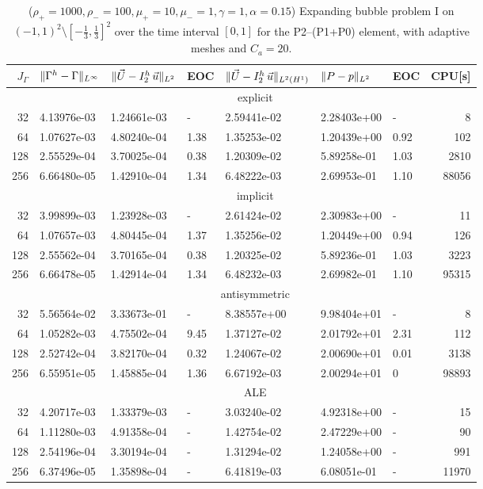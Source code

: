 \begin{table}
\center
\hspace*{-3.25cm}
\begin{tabular}{rllllllr}
\hline
$J_\Gamma$ & $\|\Gamma^h - \Gamma\|_{L^\infty}$ & $\|\vec U - I^h_{2}\,\vec u\|_{L^2}$ & EOC & $\|\vec U - I^h_{2}\,\vec u\|_{L^2(H^1)}$ & $\|P - p\|_{L^2}$ & EOC
& CPU[s] \\
\hline
& \multicolumn{7}{c}{explicit} \\
\hline
 32 & 4.13976e-03 & 1.24661e-03 &    - & 2.59441e-02 & 2.28403e+00 &    - &
8 \\
 64 & 1.07627e-03 & 4.80240e-04 & 1.38 & 1.35253e-02 & 1.20439e+00 & 0.92 &
102 \\
128 & 2.55529e-04 & 3.70025e-04 & 0.38 & 1.20309e-02 & 5.89258e-01 & 1.03 &
2810 \\
256 & 6.66480e-05 & 1.42910e-04 & 1.34 & 6.48222e-03 & 2.69953e-01 & 1.10 &
88056 \\
\hline
& \multicolumn{7}{c}{implicit} \\
\hline
 32 & 3.99899e-03 & 1.23928e-03 &    - & 2.61424e-02 & 2.30983e+00 &    - &
11 \\
 64 & 1.07657e-03 & 4.80445e-04 & 1.37 & 1.35256e-02 & 1.20449e+00 & 0.94 &
126 \\
128 & 2.55562e-04 & 3.70165e-04 & 0.38 & 1.20325e-02 & 5.89236e-01 & 1.03 &
3223 \\
256 & 6.66478e-05 & 1.42914e-04 & 1.34 & 6.48232e-03 & 2.69982e-01 & 1.10 &
95315 \\
\hline
& \multicolumn{7}{c}{antisymmetric} \\
\hline
 32 & 5.56564e-02 & 3.33673e-01 &    - & 8.38557e+00 & 9.98404e+01 &    - &
8 \\
 64 & 1.05282e-03 & 4.75502e-04 & 9.45 & 1.37127e-02 & 2.01792e+01 & 2.31 &
112 \\
128 & 2.52742e-04 & 3.82170e-04 & 0.32 & 1.24067e-02 & 2.00690e+01 & 0.01 &
3138 \\
256 & 6.55951e-05 & 1.45885e-04 & 1.36 & 6.67192e-03 & 2.00294e+01 &    0 &
98893 \\
\hline
& \multicolumn{7}{c}{ALE} \\
\hline
 32 & 4.20717e-03 & 1.33379e-03 & - & 3.03240e-02 & 4.92318e+00 & - &    15 \\
 64 & 1.11280e-03 & 4.91358e-04 & - & 1.42754e-02 & 2.47229e+00 & - &    90 \\
128 & 2.54196e-04 & 3.30194e-04 & - & 1.31294e-02 & 1.24058e+00 & - &   991 \\
256 & 6.37496e-05 & 1.35898e-04 & - & 6.41819e-03 & 6.08051e-01 & - & 11970 \\
\hline
\end{tabular}
\hspace*{-3.25cm}
\caption[Navier--Stokes expanding bubble III errors P2--(P1+P0)]
{($\rho_+ = 1000,\rho_- = 100,\mu_+ = 10,\mu_- =1,\gamma = 1,\alpha=0.15$)
Expanding bubble problem I on $(-1,1)^2\setminus[-\frac{1}{3},\frac{1}{3}]^2$
over the time interval $[0,1]$ for the P2--(P1+P0) element, with adaptive
meshes and $C_a=20$\textdegree.}
\label{tab:nsexpandingbubbleIIIp2pip0}
\end{table}

